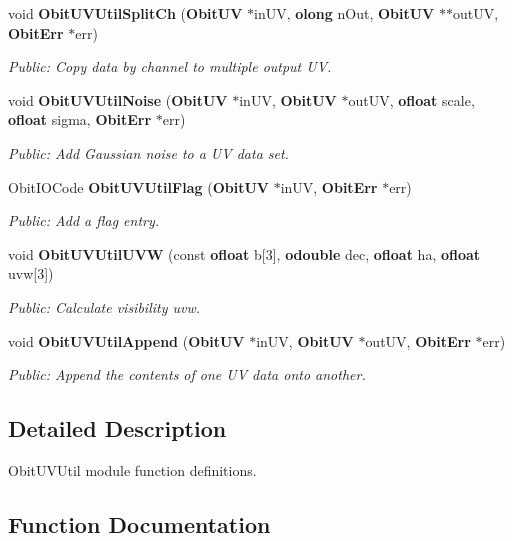 \begin{CompactItemize}
void {\bf Obit\-UVUtil\-Split\-Ch} ({\bf Obit\-UV} $\ast$in\-UV, {\bf olong} n\-Out, {\bf Obit\-UV} $\ast$$\ast$out\-UV, {\bf Obit\-Err} $\ast$err)
\begin{CompactList}\small\item\em Public: Copy data by channel to multiple output UV. \item\end{CompactList}\item 
void {\bf Obit\-UVUtil\-Noise} ({\bf Obit\-UV} $\ast$in\-UV, {\bf Obit\-UV} $\ast$out\-UV, {\bf ofloat} scale, {\bf ofloat} sigma, {\bf Obit\-Err} $\ast$err)
\begin{CompactList}\small\item\em Public: Add Gaussian noise to a UV data set. \item\end{CompactList}\item 
Obit\-IOCode {\bf Obit\-UVUtil\-Flag} ({\bf Obit\-UV} $\ast$in\-UV, {\bf Obit\-Err} $\ast$err)
\begin{CompactList}\small\item\em Public: Add a flag entry. \item\end{CompactList}\item 
void {\bf Obit\-UVUtil\-UVW} (const {\bf ofloat} b[3], {\bf odouble} dec, {\bf ofloat} ha, {\bf ofloat} uvw[3])
\begin{CompactList}\small\item\em Public: Calculate visibility uvw. \item\end{CompactList}\item 
void {\bf Obit\-UVUtil\-Append} ({\bf Obit\-UV} $\ast$in\-UV, {\bf Obit\-UV} $\ast$out\-UV, {\bf Obit\-Err} $\ast$err)
\begin{CompactList}\small\item\em Public: Append the contents of one UV data onto another. \item\end{CompactList}\end{CompactItemize}


\subsection{Detailed Description}
Obit\-UVUtil module function definitions. 



\subsection{Function Documentation}
